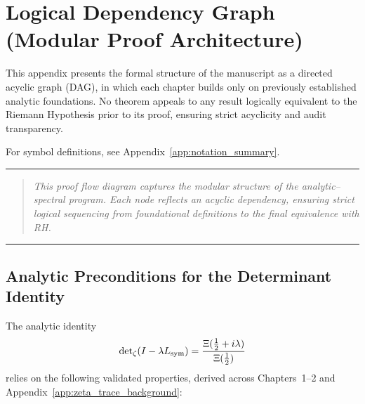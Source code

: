 \section{Logical Dependency Graph (Modular Proof Architecture)}
\label{app:dependency_graph}

This appendix presents the formal structure of the manuscript as a directed acyclic graph (DAG), in which each chapter builds only on previously established analytic foundations. No theorem appeals to any result logically equivalent to the Riemann Hypothesis prior to its proof, ensuring strict acyclicity and audit transparency.

For symbol definitions, see Appendix~\ref{app:notation_summary}.

\vspace{1ex}
\hrule
\vspace{1ex}

\begin{quote}
\textit{This proof flow diagram captures the modular structure of the analytic–spectral program. Each node reflects an acyclic dependency, ensuring strict logical sequencing from foundational definitions to the final equivalence with RH.}
\end{quote}

\vspace{1ex}
\hrule
\vspace{2ex}

\subsection*{Analytic Preconditions for the Determinant Identity}
\label{dag:determinant_preconditions}

The analytic identity
\[
\det\nolimits_{\zeta}(I - \lambda L_{\mathrm{sym}}) = \frac{\Xi(\tfrac{1}{2} + i\lambda)}{\Xi(\tfrac{1}{2})}
\]
relies on the following validated properties, derived across Chapters~1–2 and Appendix~\ref{app:zeta_trace_background}:

